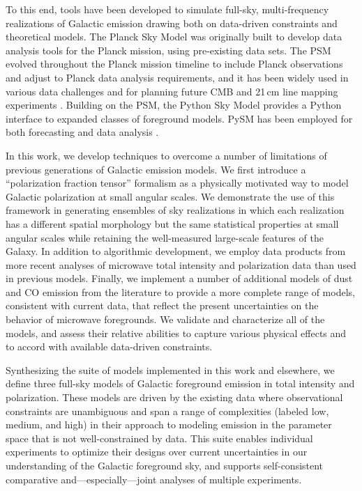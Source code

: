 \documentclass[twocolumn]{aastex631}
\begin{document}
To this end, tools have been developed to simulate full-sky, multi-frequency realizations of Galactic emission drawing both on data-driven constraints and theoretical models. The Planck Sky Model \citep[PSM;][]{delabrouille2012} was originally built to develop data analysis tools for the Planck mission, using pre-existing data sets. The PSM evolved throughout the Planck mission timeline to include Planck observations and adjust to Planck data analysis requirements, and it has been widely used in various data challenges and for planning future CMB and 21\,cm line mapping experiments \citep[e.g.,][]{Remazeilles:2018, Fornazier:2022, Ghosh:2022}. Building on the PSM, the Python Sky Model \citep[PySM;][]{Thorne:2017} provides a Python interface to expanded classes of foreground models. PySM has been employed for both forecasting \citep[e.g.,][]{Abazajian:2022, Hensley:2022, CCAT-PrimeCollaboration:2023, Wolz:2024} and data analysis \citep[e.g.,][]{BICEP2Collaboration:2018, Vacher:2023, Ade:2025}.

In this work, we develop techniques to overcome a number of limitations of previous generations of Galactic emission models. We first introduce a ``polarization fraction tensor'' formalism as a physically motivated way to model Galactic polarization at small angular scales. We demonstrate the use of this framework in generating ensembles of sky realizations in which each realization has a different spatial morphology but the same statistical properties at small angular scales while retaining the well-measured large-scale features of the Galaxy. In addition to algorithmic development, we employ data products from more recent analyses of microwave total intensity and polarization data than used in previous models. Finally, we implement a number of additional models of dust and CO emission from the literature to provide a more complete range of models, consistent with current data, that reflect the present uncertainties on the behavior of microwave foregrounds. We validate and characterize all of the models, and assess their relative abilities to capture various physical effects and to accord with available data-driven constraints.

Synthesizing the suite of models implemented in this work and elsewhere, we define three full-sky models of Galactic foreground emission in total intensity and polarization. These models are driven by the existing data where observational constraints are unambiguous and span a range of complexities (labeled low, medium, and high) in their approach to modeling emission in the parameter space that is not well-constrained by data. This suite enables individual experiments to optimize their designs over current uncertainties in our understanding of the Galactic foreground sky, and supports self-consistent comparative and---especially---joint analyses of multiple experiments.
\end{document}
